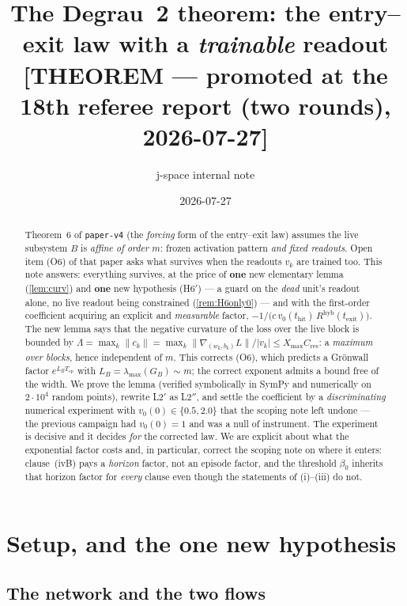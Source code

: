 \documentclass[11pt]{article}
\title{The Degrau~2 theorem: the entry--exit law with a \emph{trainable} readout\\
\large [THEOREM --- promoted at the 18th referee report (two rounds), 2026-07-27]}
\author{j-space internal note}
\date{2026-07-27}
\theoremstyle{remark}
\newcommand{\thit}{t_{\mathrm{hit}}}
\newcommand{\texit}{t_{\mathrm{exit}}}
\newcommand{\Tep}{T_{\mathrm{ep}}}
\newcommand{\hyb}{\mathrm{hyb}}
\newcommand{\Cres}{C_{\mathrm{res}}}
\newcommand{\Xmax}{X_{\max}}
\newcommand{\hyplabel}[1]{\textup{(#1)}}
\begin{document}
\maketitle

\begin{abstract}
Theorem~6 of \texttt{paper-v4} (the \emph{forcing} form of the entry--exit law)
assumes the live subsystem $B$ is \emph{affine of order $m$}: frozen activation
pattern \emph{and fixed readouts}. Open item (O6) of that paper asks what
survives when the readouts $v_k$ are trained too. This note answers: everything
survives, at the price of \textbf{one} new elementary lemma
(\cref{lem:curv}) and \textbf{one} new hypothesis \hyplabel{H6$'$} --- a guard
on the \emph{dead} unit's readout alone, no live readout being constrained
(\cref{rem:H6only0}) --- and with the
first-order coefficient acquiring an explicit and \emph{measurable} factor,
$-1/\bigl(c\,v_0(\thit)\,R^{\hyb}(\texit)\bigr)$. The new lemma says that the
negative curvature of the loss over the live block is bounded by
$\Lambda=\max_k\|c_k\|=\max_k\|\nabla_{(w_k,b_k)}L\|/|v_k|\le\Xmax\Cres$: a
\emph{maximum over blocks}, hence independent of $m$. This corrects (O6), which
predicts a Gr\"onwall factor $e^{L_B\Tep}$ with $L_B=\lambda_{\max}(G_B)\sim m$;
the correct exponent admits a bound free of the width. We prove the lemma
(verified symbolically in SymPy and numerically on $2\cdot10^4$ random points),
rewrite L2$'$ as L2$''$, and settle the coefficient by a \emph{discriminating}
numerical experiment with $v_0(0)\in\{0.5,2.0\}$ that the scoping note left
undone --- the previous campaign had $v_0(0)=1$ and was a null of instrument.
The experiment is decisive and it decides \emph{for} the corrected law. We are
explicit about what the exponential factor costs and, in particular, correct the
scoping note on where it enters: clause~(ivB) pays a \emph{horizon} factor, not
an episode factor, and the threshold $\beta_0$ inherits that horizon factor for
\emph{every} clause even though the statements of (i)--(iii) do not.
\end{abstract}

\tableofcontents

\section{Setup, and the one new hypothesis}\label{sec:setup}

\subsection{The network and the two flows}
\end{document}
